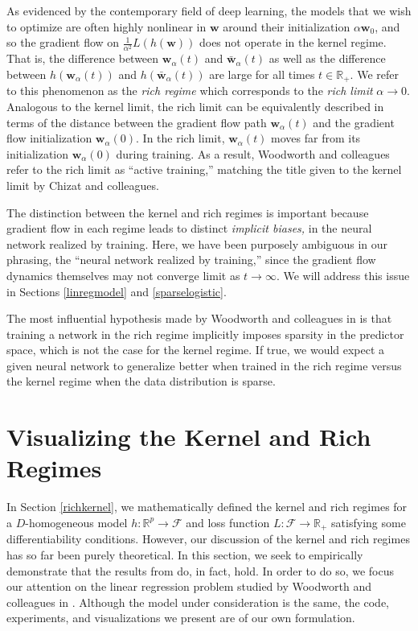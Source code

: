 \documentclass{article}
\begin{document}
As evidenced by the contemporary field of deep learning, the models that we wish to optimize are often highly nonlinear in $\boldsymbol{w}$ around their initialization $\alpha\boldsymbol{w}_0$, and so the gradient flow on $\frac{1}{\alpha^2}L(h(\boldsymbol{w}))$ does not operate in the kernel regime. That is, the difference between $\boldsymbol{w}_{\alpha}(t)$ and $\boldsymbol{\bar{w}}_{\alpha}(t)$ as well as the difference between $h(\boldsymbol{w}_{\alpha}(t))$ and $h(\boldsymbol{\bar{w}}_{\alpha}(t))$ are large for all times $t \in \mathbb{R}_+$. We refer to this phenomenon as the \textit{rich regime} which corresponds to the \textit{rich limit} $\alpha \rightarrow 0$. Analogous to the kernel limit, the rich limit can be equivalently described in terms of the distance between the gradient flow path $\boldsymbol{w}_{\alpha}(t)$ and the gradient flow initialization $\boldsymbol{w}_{\alpha}(0)$. In the rich limit, $\boldsymbol{w}_{\alpha}(t)$ moves far from its initialization $\boldsymbol{w}_{\alpha}(0)$ during training. As a result, Woodworth and colleagues refer to the rich limit as \enquote{active training,} matching the title given to the kernel limit by Chizat and colleagues.

The distinction between the kernel and rich regimes is important because gradient flow in each regime leads to distinct \textit{implicit biases,} in the neural network realized by training. Here, we have been purposely ambiguous in our phrasing, the \enquote{neural network realized by training,} since the gradient flow dynamics themselves may not converge limit as $t \rightarrow \infty$. We will address this issue in Sections \ref{linregmodel} and \ref{sparselogistic}.

The most influential hypothesis made by Woodworth and colleagues in \cite{woodworth2020kernel} is that training a network in the rich regime implicitly imposes sparsity in the predictor space, which is not the case for the kernel regime. If true, we would expect a given neural network to generalize better when trained in the rich regime versus the kernel regime when the data distribution is sparse.

\section{Visualizing the Kernel and Rich Regimes}\label{summarizekernel}

In Section \ref{richkernel}, we mathematically defined the kernel and rich regimes for a $D$-homogeneous model $h: \mathbb{R}^p \rightarrow \mathcal{F}$ and loss function $L: \mathcal{F} \rightarrow \mathbb{R}_+$ satisfying some differentiability conditions. However, our discussion of the kernel and rich regimes has so far been purely theoretical. In this section, we seek to empirically demonstrate that the results from \cite{chizat2019lazy} do, in fact, hold. In order to do so, we focus our attention on the linear regression problem studied by Woodworth and colleagues in \cite{woodworth2020kernel}. Although the model under consideration is the same, the code, experiments, and visualizations we present are of our own formulation.
\end{document}
